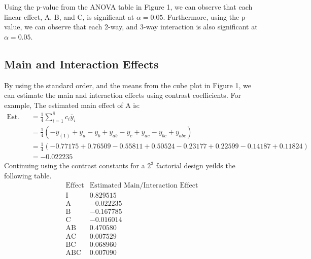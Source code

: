 \documentclass{article}
\begin{document}
Using the p-value from the ANOVA table in Figure 1, we can observe that each linear effect, A, B, and C, is significant at $\alpha = 0.05$.
Furthermore, using the p-value, we can observe that each 2-way, and 3-way interaction is also significant at $\alpha = 0.05$.

\subsection*{Main and Interaction Effects}
By using the standard order, and the means from the cube plot in Figure 1, we can estimate the main and interaction effects using contrast coefficients.
For example, The estimated main effect of A is:
\begin{align*}
  \text{Est. Main Effect of A} &= \frac{1}{4} \sum_{i=1}^{8} c_i \bar{y}_i \\
                               &= \frac{1}{4} \left( -\bar{y}_{(1)} + \bar{y}_{a} - \bar{y}_{b} + \bar{y}_{ab} - \bar{y}_{c} + \bar{y}_{ac} - \bar{y}_{bc} + \bar{y}_{abc}\right) \\
                               &= \frac{1}{4} \left( -0.77175 + 0.76509 - 0.55811 + 0.50524 - 0.23177 + 0.22599 - 0.14187 + 0.11824\right) \\ 
                               &= -0.022235
\end{align*}
Continuing using the contrast constants for a $2^3$ factorial design yeilds the following table.
\begin{equation*}
  \begin{array}{c|c}
      \text{Effect} & \text{Estimated Main/Interaction Effect} \\
      \hline
      \text{I}   & 0.829515 \\
      \text{A}   & -0.022235 \\
      \text{B}   & -0.167785 \\
      \text{C}   & -0.016014 \\
      \text{AB}  & 0.470580 \\
      \text{AC}  & 0.007529 \\
      \text{BC}  & 0.068960 \\
      \text{ABC} & 0.007090 \\
  
  \end{array}
  \end{equation*}\\

\end{document}
